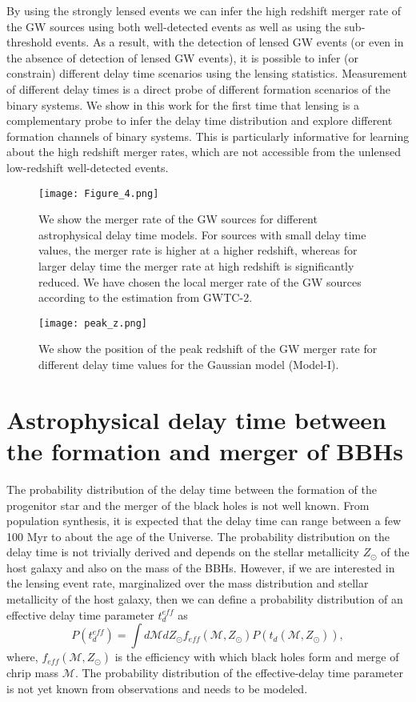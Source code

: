 \documentclass[a4paper,useAMS,usenatbib]{mnras}
\begin{document}
{By using the strongly lensed events we can infer the high redshift merger rate of the GW sources using both well-detected events as well as using the sub-threshold events. As a result, with the detection of lensed GW events (or even in the absence of detection of lensed GW events), it is possible to infer (or constrain) different delay time scenarios using the lensing statistics. Measurement of different delay times is a direct probe of different formation scenarios of the binary systems. We show in this work for the first time that lensing is a complementary probe to infer the delay time distribution and explore different formation channels of binary systems. This is particularly informative for learning about the high redshift merger rates, which are not accessible from the unlensed low-redshift well-detected events.}

\begin{figure*}
    \centering
    \texttt{[image: Figure\_4.png]}
    \caption{We show the merger rate of the GW sources for different astrophysical delay time models. For sources with small delay time values, the merger rate is higher at a higher redshift, whereas for larger delay time the merger rate at high redshift is significantly reduced. We have chosen the local merger rate of the GW sources according to the estimation from GWTC-2.}
    \label{fig:merger_rate}
\end{figure*}

\begin{figure*}
    \centering
    \texttt{[image: peak\_z.png]}
    \caption{We show the position of the peak redshift of the GW merger rate for different delay time values for the Gaussian model (Model-I).}
    \label{fig:zpeak}
\end{figure*}

\section{Astrophysical delay time between the formation and merger of BBHs}\label{ABHtimedelay}
The probability distribution of the delay time between the formation of the progenitor star and the merger of the black holes is not well known. From population synthesis, it is expected that the delay time can range between a few 100 Myr to about the age of the Universe. The probability distribution on the delay time is not trivially derived and depends on the stellar metallicity $Z_\odot$ of the host galaxy and also on the mass of the BBHs. However, if we are interested in the lensing event rate, marginalized over the mass distribution and stellar metallicity of the host galaxy, then we can define a probability distribution of an effective delay time parameter $t^{eff}_d$ as
\begin{equation}\label{ptd}
    P(t^{eff}_d) = \int d\mathcal M dZ_{\odot} f_{eff}  (\mathcal M, Z_{\odot}) P(t_d (\mathcal M, Z_{\odot})),
\end{equation}
where, $f_{eff} (\mathcal M, Z_\odot)$ is the efficiency with which black holes form and merge of chrip mass $\mathcal{M}$. The probability distribution of the effective-delay time parameter is not yet known from observations and needs to be modeled. 
\end{document}
